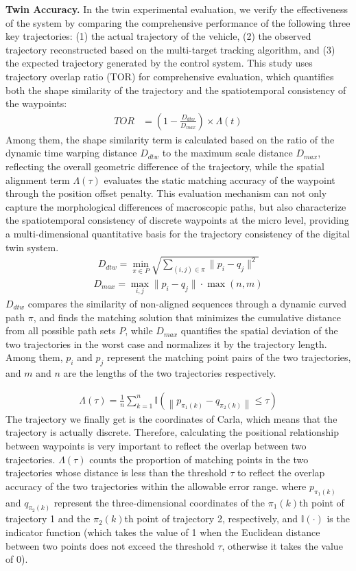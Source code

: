 \documentclass[lettersize,journal]{IEEEtran}
\begin{document}
\textbf{Twin Accuracy.}
In the twin experimental evaluation, we verify the effectiveness of the system by comparing the comprehensive performance of the following three key trajectories: (1) the actual trajectory of the vehicle, (2) the observed trajectory reconstructed based on the multi-target tracking algorithm, and (3) the expected trajectory generated by the control system.
This study uses trajectory overlap ratio (TOR) for comprehensive evaluation, which quantifies both the shape similarity of the trajectory and the spatiotemporal consistency of the waypoints:
\begin{align}
	TOR & = \left(1 - \frac{D_{dtw}}{D_{max}}\right) \times \Lambda(t)
\end{align}
Among them, the shape similarity term is calculated based on the ratio of the dynamic time warping distance $D_{dtw}$ to the maximum scale distance $D_{max}$, reflecting the overall geometric difference of the trajectory, while the spatial alignment term $\Lambda(\tau)$ evaluates the static matching accuracy of the waypoint through the position offset penalty.
This evaluation mechanism can not only capture the morphological differences of macroscopic paths, but also characterize the spatiotemporal consistency of discrete waypoints at the micro level, providing a multi-dimensional quantitative basis for the trajectory consistency of the digital twin system.
\begin{align}
	D_{dtw} = \min_{\pi \in P} \sqrt{\sum_{(i,j)\in\pi} \|p_i - q_j\|^2}
\end{align}
\begin{align}
	D_{max} = \max_{i,j} \|p_i - q_j\| \cdot \max(n,m)
\end{align}
$D_{dtw}$ compares the similarity of non-aligned sequences through a dynamic curved path $\pi$, and finds the matching solution that minimizes the cumulative distance from all possible path sets $P$, while $D_{max}$ quantifies the spatial deviation of the two trajectories in the worst case and normalizes it by the trajectory length. Among them, $p_{i}$ and $p_{j}$ represent the matching point pairs of the two trajectories, and $m$ and $n$ are the lengths of the two trajectories respectively.

\begin{align}
	\Lambda(\tau) = \frac{1}{n} \sum_{k=1}^{n} \mathbb{I}\left(\left\|p_{\pi_{1}(k)}-q_{\pi_{2}(k)}\right\| \leq \tau\right)
\end{align}
The trajectory we finally get is the coordinates of Carla, which means that the trajectory is actually discrete.
Therefore, calculating the positional relationship between waypoints is very important to reflect the overlap between two trajectories.
$\Lambda(\tau)$ counts the proportion of matching points in the two trajectories whose distance is less than the threshold $\tau$ to reflect the overlap accuracy of the two trajectories within the allowable error range.
where $p_{\pi_{1}(k)}$ and $q_{\pi_{2}(k)}$ represent the three-dimensional coordinates of the $\pi_{1}(k)$th point of trajectory 1 and the $\pi_{2}(k)$th point of trajectory 2, respectively, and $\mathbb{I}(\cdot)$ is the indicator function (which takes the value of 1 when the Euclidean distance between two points does not exceed the threshold $\tau$, otherwise it takes the value of 0).
\end{document}
